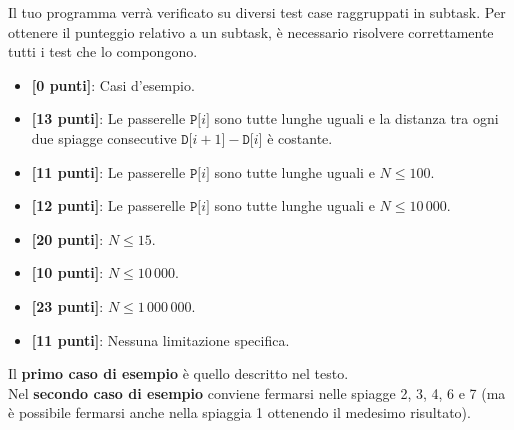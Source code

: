 \pagebreak

\Scoring

Il tuo programma verrà verificato su diversi test case raggruppati in subtask. Per ottenere il punteggio relativo a un subtask, è necessario risolvere correttamente tutti i test che lo compongono.

\begin{itemize}[nolistsep,itemsep=2mm]
  \item \textbf{ [\phantom{1}0 punti]}: Casi d'esempio.
  \item \textbf{ [13 punti]}: Le passerelle $\texttt{P[$i$]}$ sono tutte lunghe uguali e la distanza tra ogni due spiagge consecutive $\texttt{D[}i+1\texttt{]} - \texttt{D[}i\texttt{]}$ è costante.
  \item \textbf{ [11 punti]}: Le passerelle $\texttt{P[$i$]}$ sono tutte lunghe uguali e $N \leq 100$.
  \item \textbf{ [12 punti]}: Le passerelle $\texttt{P[$i$]}$ sono tutte lunghe uguali e $N \leq 10\,000$.
  \item \textbf{ [20 punti]}: $N \leq 15$.
  \item \textbf{ [10 punti]}: $N \leq 10\,000$.
  \item \textbf{ [23 punti]}: $N \leq 1\,000\,000$.
  \item \textbf{ [11 punti]}: Nessuna limitazione specifica.
\end{itemize}



\Examples

\begin{example}
%
%
\end{example}



\Explanation

Il \textbf{primo caso di esempio} è quello descritto nel testo.\\[2mm]
Nel \textbf{secondo caso di esempio} conviene fermarsi nelle spiagge 2, 3, 4, 6 e 7 (ma è possibile fermarsi anche nella spiaggia 1 ottenendo il medesimo risultato).

\begin{solution}
	
\end{solution}
